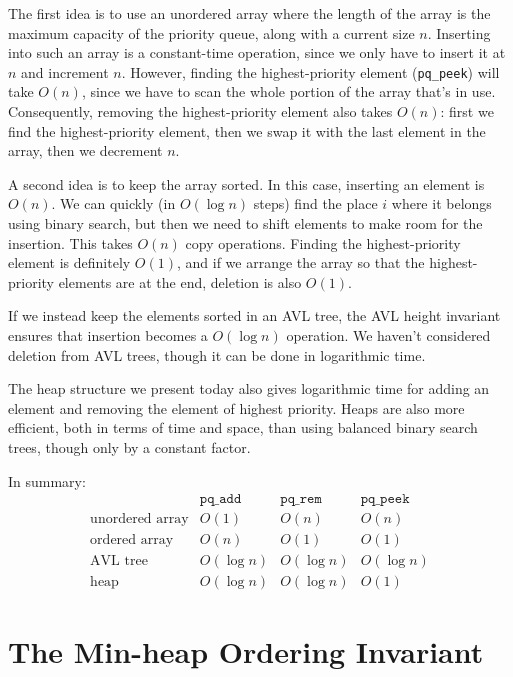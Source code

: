 The first idea is to use an unordered array where the length of the
array is the maximum capacity of the priority queue, along with a
current size  $n$. Inserting into such an array is a constant-time
operation, since we only have to insert it at $n$ and increment $n$.
However, finding the highest-priority element (\lstinline'pq_peek') will
take $O(n)$, since we have to scan the whole portion of the array
that's in use.  Consequently, removing the highest-priority element
also takes $O(n)$: first we find the highest-priority element, then we
swap it with the last element in the array, then we decrement $n$.

A second idea is to keep the array sorted.  In this case, inserting an element
is $O(n)$.  We can quickly (in $O(\log n)$ steps) find the place $i$ where it
belongs using binary search, but then we need to shift elements to make room
for the insertion.  This takes $O(n)$ copy operations. Finding the
highest-priority element is definitely $O(1)$, and if we arrange the array so
that the highest-priority elements are at the end, deletion is also $O(1)$.

If we instead keep the elements sorted in an AVL tree, the AVL height
invariant ensures that insertion becomes a $O(\log n)$ operation. We
haven't considered deletion from AVL trees, though it can be done in
logarithmic time.

The heap structure we present today also gives logarithmic time for
adding an element and removing the element of highest priority. Heaps
are also more efficient, both in terms of time and space, than using
balanced binary search trees, though only by a constant factor.

In summary:
$$
\begin{array}{lccc}
                          & \mathtt{pq\_add}& \mathtt{pq\_rem}& \mathtt{pq\_peek}
\\ \text{unordered array} & O(1)              & O(n)              & O(n)
\\ \text{ordered array}   & O(n)              & O(1)              & O(1)
\\ \text{AVL tree}        & O(\log n)         & O(\log n)         & O(\log n)
\\ \text{heap}            & O(\log n)         & O(\log n)         & O(1)
\end{array}
$$

\section{The Min-heap Ordering Invariant}
\label{sec:pq:minheap_ordering}

